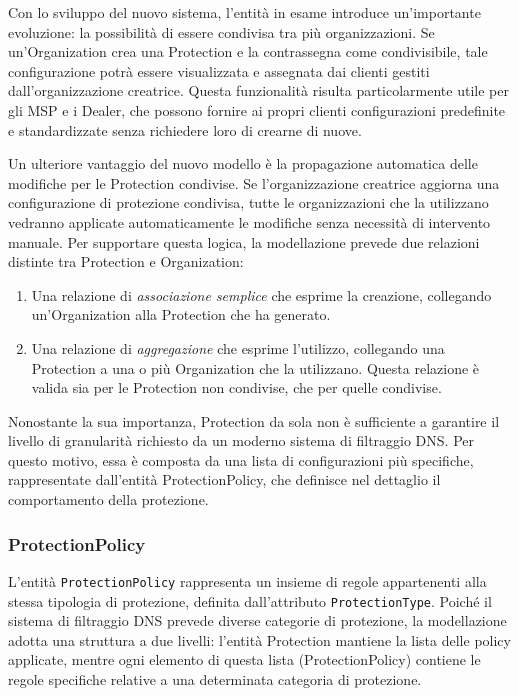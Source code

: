 Con lo sviluppo del nuovo sistema, l’entità in esame introduce un'importante evoluzione: la possibilità di essere condivisa tra più organizzazioni. Se un’Organization crea una Protection e la contrassegna come condivisibile, tale configurazione potrà essere visualizzata e assegnata dai clienti gestiti dall'organizzazione creatrice. Questa funzionalità risulta particolarmente utile per gli MSP e i Dealer, che possono fornire ai propri clienti configurazioni predefinite e standardizzate senza richiedere loro di crearne di nuove.

Un ulteriore vantaggio del nuovo modello è la propagazione automatica delle modifiche per le Protection condivise. Se l’organizzazione creatrice aggiorna una configurazione di protezione condivisa, tutte le organizzazioni che la utilizzano vedranno applicate automaticamente le modifiche senza necessità di intervento manuale. Per supportare questa logica, la modellazione prevede due relazioni distinte tra Protection e Organization:
\begin{enumerate}
  \item Una relazione di \textit{associazione semplice} che esprime la creazione, collegando un’Organization alla Protection che ha generato.
  \item Una relazione di \textit{aggregazione} che esprime l’utilizzo, collegando una Protection a una o più Organization che la utilizzano. Questa relazione è valida sia per le Protection non condivise, che per quelle condivise.
\end{enumerate}

Nonostante la sua importanza, Protection da sola non è sufficiente a garantire il livello di granularità richiesto da un moderno sistema di filtraggio DNS. Per questo motivo, essa è composta da una lista di configurazioni più specifiche, rappresentate dall'entità ProtectionPolicy, che definisce nel dettaglio il comportamento della protezione.

\subsubsection{ProtectionPolicy}
L'entità \texttt{ProtectionPolicy} rappresenta un insieme di regole appartenenti alla stessa tipologia di protezione, definita dall'attributo \texttt{ProtectionType}. Poiché il sistema di filtraggio DNS prevede diverse categorie di protezione, la modellazione adotta una struttura a due livelli: l'entità Protection mantiene la lista delle policy applicate, mentre ogni elemento di questa lista (ProtectionPolicy) contiene le regole specifiche relative a una determinata categoria di protezione.

